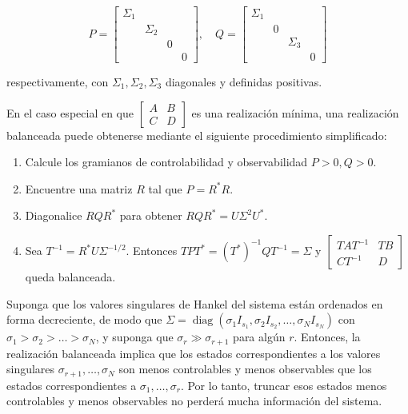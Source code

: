 $$
P=\left[\begin{array}{cccc}
\Sigma_{1} & & & \\
& \Sigma_{2} & & \\
& & 0 & \\
& & & 0
\end{array}\right], \quad Q=\left[\begin{array}{cccc}
\Sigma_{1} & & & \\
& 0 & & \\
& & \Sigma_{3} & \\
& & & 0
\end{array}\right]
$$

respectivamente, con $\Sigma_{1}, \Sigma_{2}, \Sigma_{3}$ diagonales y definidas positivas.

En el caso especial en que $\left[\begin{array}{c|c}A & B \\ \hline C & D\end{array}\right]$ es una realización mínima, una realización balanceada puede obtenerse mediante el siguiente procedimiento simplificado:

\begin{enumerate}
  \item Calcule los gramianos de controlabilidad y observabilidad $P>0, Q>0$.
  \item Encuentre una matriz $R$ tal que $P=R^{*} R$.
  \item Diagonalice $R Q R^{*}$ para obtener $R Q R^{*}=U \Sigma^{2} U^{*}$.
  \item Sea $T^{-1}=R^{*} U \Sigma^{-1 / 2}$. Entonces $T P T^{*}=\left(T^{*}\right)^{-1} Q T^{-1}=\Sigma$ y $\left[\begin{array}{c|c}T A T^{-1} & T B \\ \hline C T^{-1} & D\end{array}\right]$ queda balanceada.
\end{enumerate}

Suponga que los valores singulares de Hankel del sistema están ordenados en forma decreciente, de modo que $\Sigma=\operatorname{diag}\left(\sigma_{1} I_{s_{1}}, \sigma_{2} I_{s_{2}}, \ldots, \sigma_{N} I_{s_{N}}\right)$ con $\sigma_{1}>\sigma_{2}>\ldots>\sigma_{N}$, y suponga que $\sigma_{r} \gg \sigma_{r+1}$ para algún $r$. Entonces, la realización balanceada implica que los estados correspondientes a los valores singulares $\sigma_{r+1}, \ldots, \sigma_{N}$ son menos controlables y menos observables que los estados correspondientes a $\sigma_{1}, \ldots, \sigma_{r}$. Por lo tanto, truncar esos estados menos controlables y menos observables no perderá mucha información del sistema.

